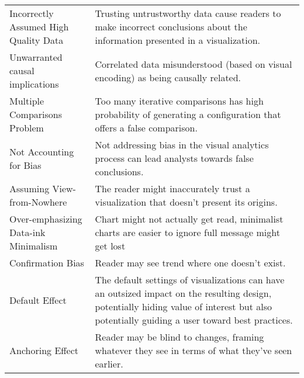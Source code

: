 \begin{table*}[]
\begin{tabular}{p{5cm}p{12cm}}
   \rowcolor{colord}\multirow{9}{0em}{\hspace{-0.6cm}\rotatebox{90}{\normalsize{Reading}}}Incorrectly Assumed High Quality Data & Trusting untrustworthy data cause readers to make incorrect conclusions about the information presented in a visualization. \cite{mayrTrust2019, sacha2015role}\\
 \rowcolor{colord-opaque}Unwarranted causal implications & Correlated data misunderstood (based on visual encoding) as being causally related. \cite{xiong2019illusion, few2019loom}\\
 \rowcolor{colord}Multiple Comparisons Problem & Too many iterative comparisons has high probability of generating a configuration that offers a false comparison. \cite{pu2018garden, zgraggen2018investigating}\\
 \rowcolor{colord-opaque}Not Accounting for Bias & Not addressing bias in the visual analytics process can lead analysts towards false conclusions. \cite{wall2017warning}\\
 \rowcolor{colord}Assuming View-from-Nowhere & The reader might inaccurately trust a visualization that doesn't present its origins. \cite{dignazio2019draft}\\
 \rowcolor{colord-opaque}Over-emphasizing Data-ink Minimalism & Chart might not actually get read, minimalist charts are easier to ignore full message might get lost \cite{bateman2010useful}\\
 \rowcolor{colord}Confirmation Bias & Reader may see trend where one doesn't exist. \cite{valdez2017framework, few2019loom}\\
 \rowcolor{colord-opaque}Default Effect & The default settings of visualizations can have an outsized impact on the resulting design, potentially hiding value of interest but  also potentially guiding a user toward best practices. \cite{shah2006policy,few2019loom, hullman2011visualization}\\
 \rowcolor{colord}Anchoring Effect & Reader may be blind to changes, framing whatever they see in terms of what they've seen earlier. \cite{ritchie2019lie, hullman2011visualization}\\
\end{tabular}
\label{table:mirage-table}
\end{table*}
